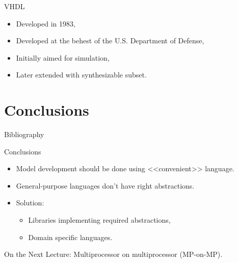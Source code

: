 
\begin{frame}{VHDL}
  \begin{itemize}
    \item Developed in 1983,
    \item Developed at the behest of the U.S. Department of Defense,
    \item Initially aimed for simulation,
    \item Later extended with synthesizable subset.
  \end{itemize}
\end{frame}


\section*{Conclusions}

\begin{frame}[allowframebreaks]{Bibliography}
  \nocite{Hadjiyiannis-ISDL}
  \nocite{Schliebusch-LISA}
  \nocite{Nikhil-BSV}
  \printbibliography
\end{frame}

\begin{frame}{Conclusions}
  \begin{itemize}
    \item Model development should be done using <<convenient>> language.
    \item General-purpose languages don't have right abstractions.
    \item Solution:
    \begin{itemize}
      \item Libraries implementing required abstractions,
      \item Domain specific languages.
    \end{itemize}
  \end{itemize}
\end{frame}

\begin{frame}{On the Next Lecture:}
  Multiprocessor on multiprocessor (MP-on-MP).
\end{frame}

\finalslide


